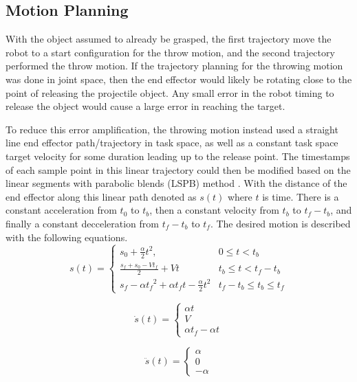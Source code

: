 \documentclass[conference]{IEEEtran}
\begin{document}
\subsection{Motion Planning}
With the object assumed to already be grasped, the first trajectory move the
robot to a start configuration for the throw motion, and the second trajectory
performed the throw motion. If the trajectory planning for the throwing motion
was done in joint space, then the end effector would likely be rotating close to
the point of releasing the projectile object. Any small error in the robot
timing to release the object would cause a large error in reaching the target.

To reduce this error amplification, the throwing motion instead used a straight
line end effector path/trajectory in task space, as well as a constant task
space target velocity for some duration leading up to the release point. The
timestamps of each sample point in this linear trajectory could then be modified
based on the linear segments with parabolic blends (LSPB) method
\cite{mark2020control}. With the distance of the end effector along this linear
path denoted as $s(t)$ where $t$ is time. There is a constant acceleration from
$t_0$ to $t_b$, then a constant velocity from $t_b$ to $t_f-t_b$, and finally a
constant decceleration from $t_f-t_b$ to $t_f$. The desired motion is described
with the following equations.
\begin{equation*}
  s(t) =
  \begin{cases}
    s_0+\frac{\alpha}{2}t^2, & 0 \leq t < t_b \\
    \frac{s_f+s_0-Vt_f}{2} + Vt & t_b \leq t < t_f-t_b \\
    s_f-\alpha {t_f}^2+\alpha t_f t-\frac{\alpha}{2} t^2 & t_f-t_b \leq t_b \leq t_f
  \end{cases}
\end{equation*}

\begin{equation*}
  \dot{s}(t) =
  \begin{cases}
    \alpha t \\
    V \\
    \alpha t_f - \alpha t
  \end{cases}
\end{equation*}

\begin{equation*}
  \ddot{s}(t) =
  \begin{cases}
    \alpha \\
    0 \\
    -\alpha
  \end{cases}
\end{equation*}
\end{document}
